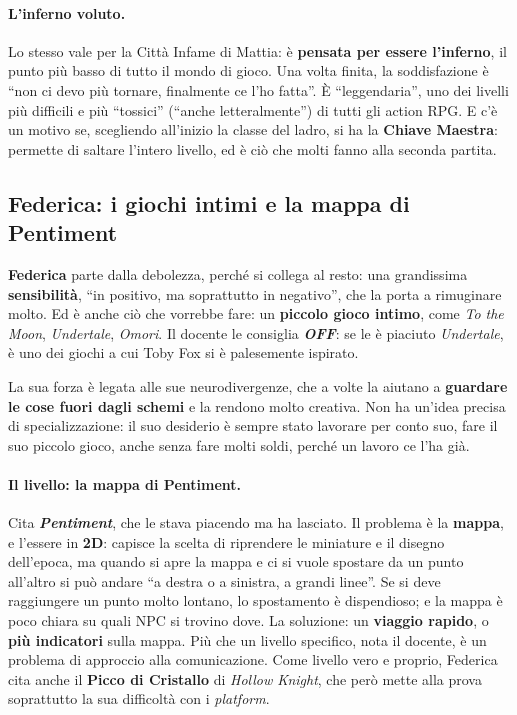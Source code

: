 \paragraph{L'inferno voluto.} Lo stesso vale per la Città Infame di Mattia:
è \textbf{pensata per essere l'inferno}, il punto più basso di tutto il mondo
di gioco. Una volta finita, la soddisfazione è ``non ci devo più tornare,
finalmente ce l'ho fatta''. È ``leggendaria'', uno dei livelli più difficili e
più ``tossici'' (``anche letteralmente'') di tutti gli action RPG. E c'è un
motivo se, scegliendo all'inizio la classe del ladro, si ha la
\textbf{Chiave Maestra}: permette di saltare l'intero livello, ed è ciò che
molti fanno alla seconda partita.

\subsection{Federica: i giochi intimi e la mappa di Pentiment}

\textbf{Federica} parte dalla debolezza, perché si collega al resto: una
grandissima \textbf{sensibilità}, ``in positivo, ma soprattutto in negativo'',
che la porta a rimuginare molto. Ed è anche ciò che vorrebbe fare: un
\textbf{piccolo gioco intimo}, come \emph{To the Moon}, \emph{Undertale},
\emph{Omori}. Il docente le consiglia \textbf{\emph{OFF}}: se le è piaciuto
\emph{Undertale}, è uno dei giochi a cui Toby Fox si è palesemente ispirato.

La sua forza è legata alle sue neurodivergenze, che a volte la aiutano a
\textbf{guardare le cose fuori dagli schemi} e la rendono molto creativa. Non
ha un'idea precisa di specializzazione: il suo desiderio è sempre stato
lavorare per conto suo, fare il suo piccolo gioco, anche senza fare molti
soldi, perché un lavoro ce l'ha già.

\paragraph{Il livello: la mappa di Pentiment.} Cita \textbf{\emph{Pentiment}},
che le stava piacendo ma ha lasciato. Il problema è la \textbf{mappa}, e
l'essere in \textbf{2D}: capisce la scelta di riprendere le miniature e il
disegno dell'epoca, ma quando si apre la mappa e ci si vuole spostare da un
punto all'altro si può andare ``a destra o a sinistra, a grandi linee''. Se si
deve raggiungere un punto molto lontano, lo spostamento è dispendioso; e la
mappa è poco chiara su quali NPC si trovino dove. La soluzione: un
\textbf{viaggio rapido}, o \textbf{più indicatori} sulla mappa. Più che un
livello specifico, nota il docente, è un problema di approccio alla
comunicazione. Come livello vero e proprio, Federica cita anche il
\textbf{Picco di Cristallo} di \emph{Hollow Knight}, che però mette alla prova
soprattutto la sua difficoltà con i \emph{platform}.

